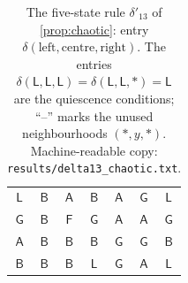 \begin{table}[p]
\begin{tabular}{@{}cc|ccccc@{}}
$\mathsf{L}$ & $\mathsf{B}$ & $\mathsf{A}$ & $\mathsf{B}$ & $\mathsf{A}$ & $\mathsf{G}$ & $\mathsf{L}$\\
$\mathsf{G}$ & $\mathsf{B}$ & $\mathsf{F}$ & $\mathsf{G}$ & $\mathsf{A}$ & $\mathsf{A}$ & $\mathsf{G}$\\
$\mathsf{A}$ & $\mathsf{B}$ & $\mathsf{B}$ & $\mathsf{B}$ & $\mathsf{G}$ & $\mathsf{G}$ & $\mathsf{B}$\\
$\mathsf{B}$ & $\mathsf{B}$ & $\mathsf{B}$ & $\mathsf{L}$ & $\mathsf{G}$ & $\mathsf{A}$ & $\mathsf{L}$\\
\bottomrule
\end{tabular}
\caption{The five-state rule $\delta'_{13}$ of \cref{prop:chaotic}: entry $\delta(\text{left},\text{centre},\text{right})$. The entries $\delta(\mathsf L,\mathsf L,\mathsf L)=\delta(\mathsf L,\mathsf L,\ast)=\mathsf L$ are the quiescence conditions; ``--'' marks the unused neighbourhoods $(\ast,y,\ast)$. Machine-readable copy: \texttt{results/delta13\_chaotic.txt}.}
\label{tab:delta13c}
\end{table}
